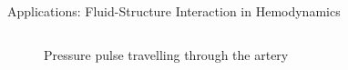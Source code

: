 \documentclass[final,utf8,,hyperref={pdfpagelabels=false}]{beamer}
\begin{document}
\begin{frame}[containsverbatim]{}
\begin{columns}[t]
\begin{block}{Applications: Fluid-Structure Interaction in Hemodynamics}
\begin{columns}[c]
\begin{column}{.40\linewidth}
\begin{figure}
\begin{minipage}[b]{0.6\linewidth}
          \end{minipage}
          \begin{minipage}[t]{0.25\linewidth}
            \centering
          \end{minipage}
          \caption{Pressure pulse travelling through the artery}
          \label{pressure_wave}
        \end{figure}
        

\end{column}
\end{columns}
\end{block}
\end{columns}
\end{frame}
\end{document}
